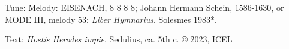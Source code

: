

\begin{hymnsource}
Tune: Melody: EISENACH, 8 8 8 8; Johann Hermann Schein, 1586-1630, or MODE III, melody 53; \emph{Liber Hymnarius}, Solesmes 1983*.

Text: \emph{Hostis Herodes impie}, Sedulius, ca. 5th c. © 2023, ICEL
\end{hymnsource}
